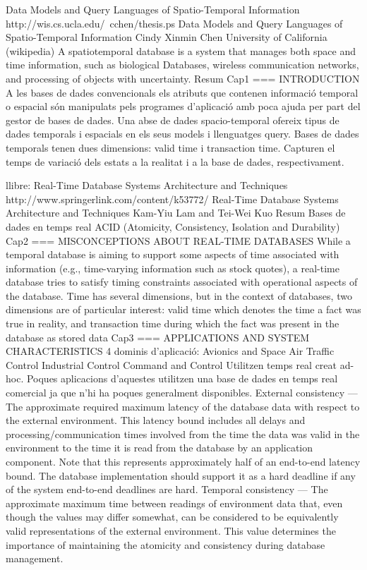 Data Models and Query Languages of Spatio-Temporal Information
​http://wis.cs.ucla.edu/~cchen/thesis.ps
Data Models and Query Languages of Spatio-Temporal Information
Cindy Xinmin Chen
University of California
(wikipedia) A spatiotemporal database is a system that manages both space and time information, such as biological Databases, wireless communication networks, and processing of objects with uncertainty.
Resum
Cap1 
===
INTRODUCTION
A les bases de dades convencionals els atributs que contenen informació temporal o espacial són manipulats pels programes d'aplicació amb poca ajuda per part del gestor de bases de dades. Una abse de dades spacio-temporal ofereix tipus de dades temporals i espacials en els seus models i llenguatges query.
Bases de dades temporals tenen dues dimensions: valid time i transaction time. Capturen el temps de variació dels estats a la realitat i a la base de dades, respectivament.


llibre: Real-Time Database Systems Architecture and Techniques
​http://www.springerlink.com/content/k53772/
Real-Time Database Systems Architecture and Techniques
Kam-Yiu Lam and Tei-Wei Kuo
Resum
Bases de dades en temps real
ACID (Atomicity, Consistency, Isolation and Durability)
Cap2
===
MISCONCEPTIONS ABOUT REAL-TIME DATABASES
While a temporal database is aiming to support some aspects of time associated with information (e.g., time-varying information such as stock quotes), a real-time
database tries to satisfy timing constraints associated with operational aspects
of the database.
Time has several dimensions, but in the context of databases, two dimensions
are of particular interest: valid time which denotes the time a fact was true in
reality, and transaction time during which the fact was present in the database
as stored data
Cap3
===
APPLICATIONS AND SYSTEM CHARACTERISTICS
4 dominis d'aplicació:
Avionics and Space
Air Traffic Control
Industrial Control
Command and Control
Utilitzen temps real creat ad-hoc. Poques aplicacions d'aquestes utilitzen una base de dades en temps real comercial ja que n'hi ha poques generalment disponibles.
External consistency — The approximate required maximum latency
of the database data with respect to the external environment. This
latency bound includes all delays and processing/communication times
involved from the time the data was valid in the environment to the time
it is read from the database by an application component. Note that
this represents approximately half of an end-to-end latency bound. The
database implementation should support it as a hard deadline if any of
the system end-to-end deadlines are hard.
Temporal consistency — The approximate maximum time between
readings of environment data that, even though the values may differ
somewhat, can be considered to be equivalently valid representations
of the external environment. This value determines the importance of
maintaining the atomicity and consistency during database management.





